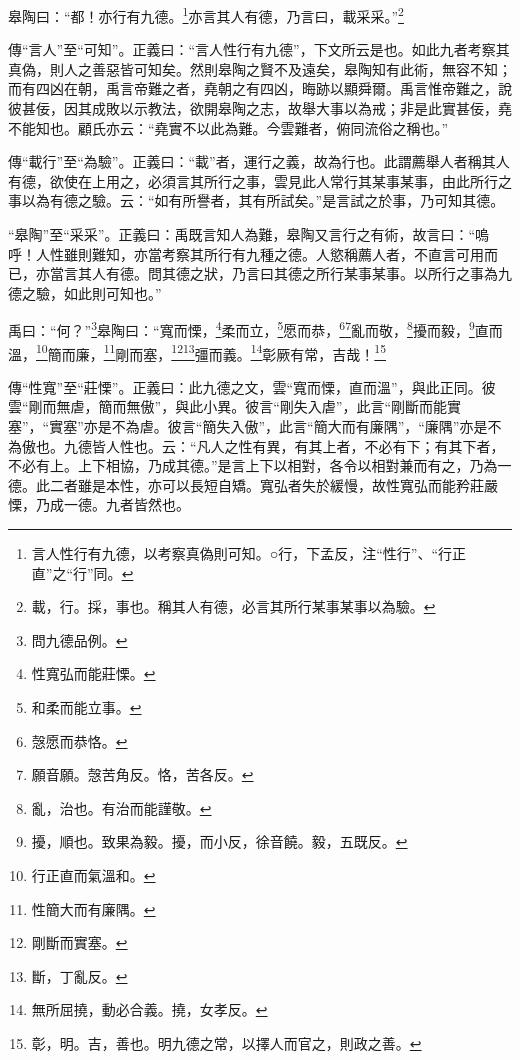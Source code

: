 皋陶曰：“都！亦行有九德。\footnote{言人性行有九德，以考察真偽則可知。○行，下孟反，注“性行”、“行正直”之“行”同。}亦言其人有德，乃言曰，載采采。”\footnote{載，行。採，事也。稱其人有德，必言其所行某事某事以為驗。}


{\noindent\zhuan{}\fzbyks 傳“言人”至“可知”。正義曰：“言人性行有九德”，下文所云是也。如此九者考察其真偽，則人之善惡皆可知矣。然則皋陶之賢不及遠矣，皋陶知有此術，無容不知；而有四凶在朝，禹言帝難之者，堯朝之有四凶，晦跡以顯舜爾。禹言惟帝難之，說彼甚佞，因其成敗以示教法，欲開皋陶之志，故舉大事以為戒；非是此實甚佞，堯不能知也。顧氏亦云：“堯實不以此為難。今雲難者，俯同流俗之稱也。” \par}

{\noindent\zhuan{}\fzbyks 傳“載行”至“為驗”。正義曰：“載”者，運行之義，故為行也。此謂薦舉人者稱其人有德，欲使在上用之，必須言其所行之事，雲見此人常行其某事某事，由此所行之事以為有德之驗。云：“如有所譽者，其有所試矣。”是言試之於事，乃可知其德。 \par}

{\noindent\shu{}\fzkt “皋陶”至“采采”。正義曰：禹既言知人為難，皋陶又言行之有術，故言曰：“嗚呼！人性雖則難知，亦當考察其所行有九種之德。人慾稱薦人者，不直言可用而已，亦當言其人有德。問其德之狀，乃言曰其德之所行某事某事。以所行之事為九德之驗，如此則可知也。” \par}

禹曰：“何？”\footnote{問九德品例。}皋陶曰：“寬而慄，\footnote{性寬弘而能莊慄。}柔而立，\footnote{和柔而能立事。}愿而恭，\footnote{愨愿而恭恪。}\footnote{願音願。愨苦角反。恪，苦各反。}亂而敬，\footnote{亂，治也。有治而能謹敬。}擾而毅，\footnote{擾，順也。致果為毅。擾，而小反，徐音饒。毅，五既反。}直而溫，\footnote{行正直而氣溫和。}簡而廉，\footnote{性簡大而有廉隅。}剛而塞，\footnote{剛斷而實塞。}\footnote{斷，丁亂反。}彊而義。\footnote{無所屈撓，動必合義。撓，女孝反。}彰厥有常，吉哉！\footnote{彰，明。吉，善也。明九德之常，以擇人而官之，則政之善。}

{\noindent\zhuan{}\fzbyks 傳“性寬”至“莊慄”。正義曰：此九德之文，雲“寬而慄，直而溫”，與此正同。彼雲“剛而無虐，簡而無傲”，與此小異。彼言“剛失入虐”，此言“剛斷而能實塞”，“實塞”亦是不為虐。彼言“簡失入傲”，此言“簡大而有廉隅”，“廉隅”亦是不為傲也。九德皆人性也。云：“凡人之性有異，有其上者，不必有下；有其下者，不必有上。上下相協，乃成其德。”是言上下以相對，各令以相對兼而有之，乃為一德。此二者雖是本性，亦可以長短自矯。寬弘者失於緩慢，故性寬弘而能矜莊嚴慄，乃成一德。九者皆然也。 \par}

